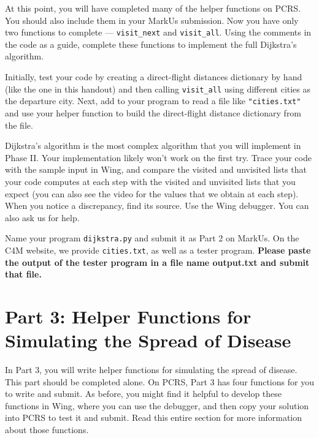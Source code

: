\documentclass{assignment}
\begin{document}
At this point, you will have completed many of the helper functions on PCRS. You should also include them in your MarkUs submission. Now you have only two functions to complete --- \verb|visit_next| and \verb|visit_all|.  Using the comments in the code as a guide, complete these functions to implement the full Dijkstra's algorithm.

Initially, test your code by creating a direct-flight distances dictionary by hand (like the one in this handout) and then calling \verb|visit_all| using different cities as the departure city. Next, add to your program to read a file like \verb|"cities.txt"| and use your helper function to build the direct-flight distance dictionary from the file. 

Dijkstra's algorithm is the most complex algorithm that you will implement in Phase II. Your implementation likely won't work on the first try. Trace your code with the sample input in Wing, and compare the visited and unvisited lists that your code computes at each step with the visited and unvisited lists that you expect (you can also see the video for the values that we obtain at each step). When you notice a discrepancy, find its source. Use the Wing debugger. You can also ask us for help.

Name your program \verb|dijkstra.py| and submit it as Part 2 on MarkUs. On the C4M website, we provide \verb|cities.txt|, as well as a tester program. \textbf{Please paste the output of the tester program in a file name output.txt and submit that file.}


\section*{Part 3: Helper Functions for Simulating the Spread of Disease}



In Part 3, you will write helper functions for simulating the spread of disease.  This part should be completed alone.
On PCRS, Part 3 has four functions for you to write and submit.  As before, you might find it helpful to develop these functions in Wing, where you can use the debugger, and then copy your solution into PCRS to test it and submit.  Read this entire section for more information about those functions.
\end{document}

